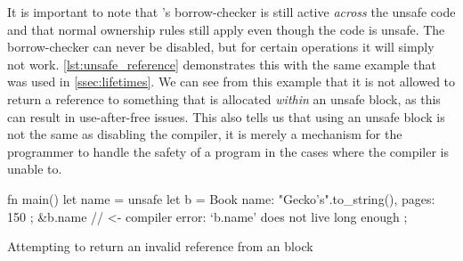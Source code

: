 It is important to note that {\rust}'s borrow-checker is still active \emph{across} the unsafe code and that normal ownership rules still apply even though the code is unsafe.
The borrow-checker can never be disabled, but for certain operations it will simply not work.
\autoref{lst:unsafe_reference} demonstrates this with the same example that was used in \autoref{ssec:lifetimes}.
We can see from this example that it is not allowed to return a reference to something that is allocated \emph{within} an unsafe block, as this can result in use-after-free issues.
This also tells us that using an unsafe block is not the same as disabling the compiler, it is merely a mechanism for the programmer to handle the safety of a program in the cases where the compiler is unable to.

\begin{listing}[H]
\begin{rustcode}
fn main() {
  let name = unsafe {
    let b = Book { name: "Gecko's".to_string(), pages: 150 };
    &b.name // <- compiler error: `b.name' does not live long enough
  };
}
\end{rustcode}
\caption{Attempting to return an invalid reference from an  block}
\label{lst:unsafe_reference}
\end{listing}

